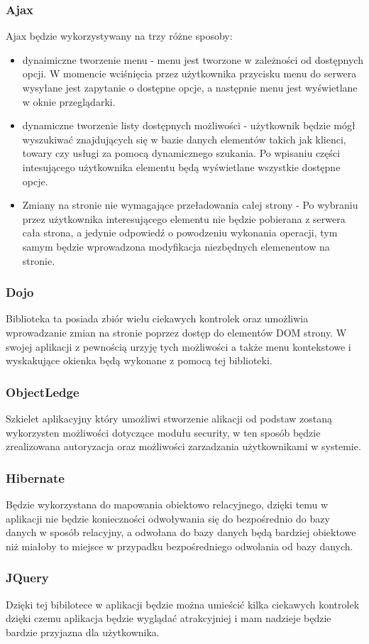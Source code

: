 \subsubsection{Ajax}
Ajax będzie wykorzystywany na trzy różne sposoby:
\begin{itemize}
  \item dynaimiczne tworzenie menu - menu jest tworzone w zależności od dostępnych opcji. W momencie wciśnięcia
  przez użytkownika przycisku menu do serwera wysyłane jest zapytanie o dostępne opcje, a następnie menu 
   jest wyświetlane w oknie przeglądarki.
  
  \item dynamiczne tworzenie listy dostępnych możliwości - użytkownik będzie mógł wyszukiwać znajdujących 
  się w bazie danych elementów takich jak klienci, towary czy usługi za pomocą dynamicznego szukania.
  Po wpisaniu części intesującego użytkownika elementu będą wyświetlane wszystkie dostępne opcje.
  \item Zmiany na stronie nie wymagające przeładowania całej strony - Po wybraniu przez użytkownika interesującego
   elementu nie będzie pobierana z serwera cała strona, a jedynie odpowiedź o powodzeniu wykonania operacji,
   tym samym będzie wprowadzona modyfikacja niezbędnych elemenentow na stronie.
\end{itemize}
\subsubsection{Dojo}
Biblioteka ta posiada zbiór wielu ciekawych kontrolek oraz umożliwia wprowadzanie zmian na stronie poprzez 
dostęp do elementów DOM strony. W swojej aplikacji z pewnością urzyję tych możliwości a także menu kontekstowe
i wyskakujące okienka będą wykonane z pomocą tej biblioteki.
\subsubsection{ObjectLedge}
Szkielet aplikacyjny który umożliwi stworzenie alikacji od podstaw zostaną wykorzysten możliwości dotyczące 
modułu security, w ten sposób będzie zrealizowana autoryzacja oraz możliwości zarzadzania użytkownikami w 
systemie.
\subsubsection{Hibernate}
Będzie wykorzystana do mapowania obiektowo relacyjnego, dzięki temu w aplikacji nie będzie konieczności 
odwoływania się do bezpośrednio do bazy danych w sposób relacyjny, a odwołana do bazy danych będą bardziej 
obiektowe niż miałoby to miejsce w przypadku bezpośredniego odwolania od bazy danych.
\subsubsection{JQuery}
Dzięki tej bibilotece w aplikacji będzie można umieścić kilka ciekawych kontrolek dzięki czemu 
aplikacja będzie wyglądać atrakcyjniej i mam nadzieje będzie bardzie przyjazna dla użytkownika.


